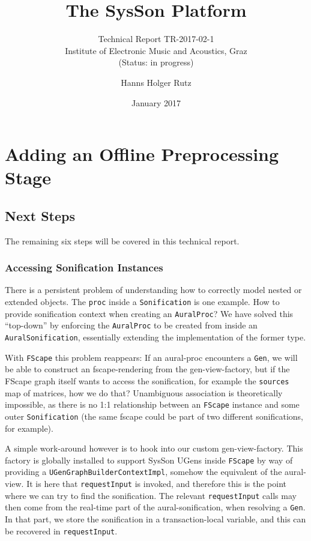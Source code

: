 \documentclass[11pt,a4paper]{article}
\title{The SysSon Platform}
\subtitle{Technical Report TR-2017-02-1\\Institute of Electronic Music and Acoustics, Graz\\(Status: in progress)}
\author{Hanns Holger Rutz}
\date{January 2017}
\begin{document}
\maketitle
{}
\thispagestyle{empty}
\newpage
\section{Adding an Offline Preprocessing Stage}

\subsection{Next Steps}

The remaining six steps will be covered in this technical report.

\subsubsection{Accessing Sonification Instances}

There is a persistent problem of understanding how to correctly model nested or extended objects. The \Verb!proc! inside a \Verb!Sonification! is one example. How to provide sonification context when creating an \Verb!AuralProc!? We have solved this ``top-down'' by enforcing the \Verb!AuralProc! to be created from inside an \Verb!AuralSonification!, essentially extending the implementation of the former type.

With \Verb!FScape! this problem reappears: If an aural-proc encounters a \Verb!Gen!, we will be able to construct an fscape-rendering from the gen-view-factory, but if the FScape graph itself wants to access the sonification, for example the \Verb!sources! map of matrices, how we do that? Unambiguous association is theoretically impossible, as there is no 1:1 relationship between an \Verb!FScape! instance and some outer \Verb!Sonification! (the same fscape could be part of two different sonifications, for example).

A simple work-around however is to hook into our custom gen-view-factory. This factory is globally installed to support SysSon UGens inside \Verb!FScape! by way of providing a \Verb!UGenGraphBuilderContextImpl!, somehow the equivalent of the aural-view. It is here that \Verb!requestInput! is invoked, and therefore this is the point where we can try to find the sonification. The relevant \Verb!requestInput! calls may then come from the real-time part of the aural-sonification, when resolving a \Verb!Gen!. In that part, we store the sonification in a transaction-local variable, and this can be recovered in \Verb!requestInput!.
\end{document}

